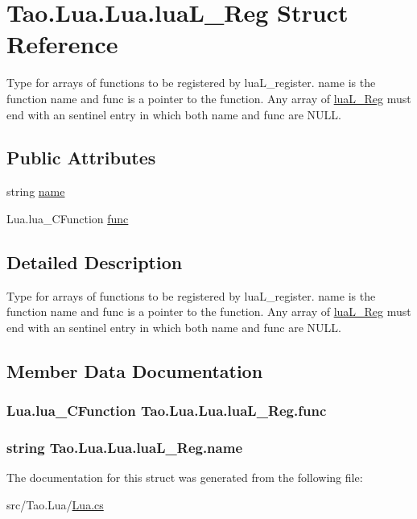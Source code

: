 \hypertarget{struct_tao_1_1_lua_1_1_lua_1_1lua_l___reg}{
\section{Tao.Lua.Lua.luaL\_\-Reg Struct Reference}
\label{struct_tao_1_1_lua_1_1_lua_1_1lua_l___reg}
}


Type for arrays of functions to be registered by luaL\_\-register. name is the function name and func is a pointer to the function. Any array of \hyperlink{struct_tao_1_1_lua_1_1_lua_1_1lua_l___reg}{luaL\_\-Reg} must end with an sentinel entry in which both name and func are NULL.  


\subsection*{Public Attributes}
\begin{DoxyCompactItemize}
\item 
string \hyperlink{struct_tao_1_1_lua_1_1_lua_1_1lua_l___reg_aed9d5f65f2ac989a5c262a88ce904a77}{name}
\item 
Lua.lua\_\-CFunction \hyperlink{struct_tao_1_1_lua_1_1_lua_1_1lua_l___reg_a70f31e4d0392f6c87e17730dfd2a47d8}{func}
\end{DoxyCompactItemize}


\subsection{Detailed Description}
Type for arrays of functions to be registered by luaL\_\-register. name is the function name and func is a pointer to the function. Any array of \hyperlink{struct_tao_1_1_lua_1_1_lua_1_1lua_l___reg}{luaL\_\-Reg} must end with an sentinel entry in which both name and func are NULL. 

\subsection{Member Data Documentation}
\hypertarget{struct_tao_1_1_lua_1_1_lua_1_1lua_l___reg_a70f31e4d0392f6c87e17730dfd2a47d8}{
\subsubsection[{func}]{\setlength{\rightskip}{0pt plus 5cm}Lua.lua\_\-CFunction {\bf Tao.Lua.Lua.luaL\_\-Reg.func}}}
\label{struct_tao_1_1_lua_1_1_lua_1_1lua_l___reg_a70f31e4d0392f6c87e17730dfd2a47d8}
\hypertarget{struct_tao_1_1_lua_1_1_lua_1_1lua_l___reg_aed9d5f65f2ac989a5c262a88ce904a77}{
\subsubsection[{name}]{\setlength{\rightskip}{0pt plus 5cm}string {\bf Tao.Lua.Lua.luaL\_\-Reg.name}}}
\label{struct_tao_1_1_lua_1_1_lua_1_1lua_l___reg_aed9d5f65f2ac989a5c262a88ce904a77}


The documentation for this struct was generated from the following file:\begin{DoxyCompactItemize}
\item 
src/Tao.Lua/\hyperlink{_lua_8cs}{Lua.cs}\end{DoxyCompactItemize}
